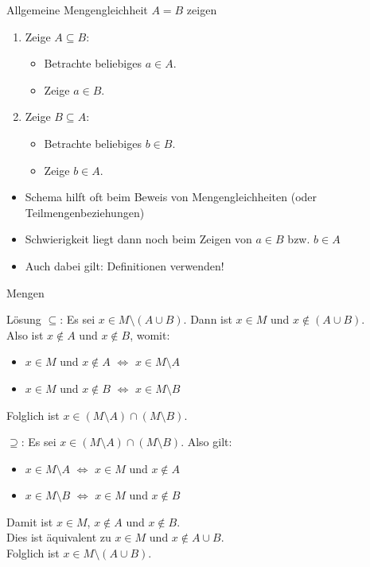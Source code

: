 	\begin{frame}{Allgemeine Mengengleichheit $A=B$ zeigen}

		\begin{enumerate}
			\item Zeige $A \subseteq B$: \begin{itemize}
				\item Betrachte beliebiges $a \in A$.
				\item Zeige $a \in B$.
			\end{itemize}
			\item Zeige $B \subseteq A$: \begin{itemize}
				\item Betrachte beliebiges $b \in B$.
				\item Zeige $b \in A$.
			\end{itemize}
		\end{enumerate}
		\pause
		\medskip
		\begin{itemize}
			\item Schema hilft oft beim Beweis von Mengengleichheiten (oder Teilmengenbeziehungen)
			\item Schwierigkeit liegt dann noch beim Zeigen von $a \in B$ bzw. $b \in A$
			\item Auch dabei gilt: Definitionen verwenden!
		\end{itemize}
		
	\end{frame}

	\begin{frame}{Mengen}
		\begin{block}{Lösung}
			$\subseteq$:
				Es sei $x \in M \setminus (A \cup B)$. Dann ist $x \in M$ und $x \notin (A \cup B)$.\\
				Also ist $x \notin A$ und $x \notin B$, womit:
				\begin{itemize}
					\itemsep0pt
					\item $x \in M$ und $x \notin A$ $\Longleftrightarrow $ $x \in M \setminus A$
					\item $x \in M$ und $x \notin B$ $\Longleftrightarrow$ $x \in M \setminus B$
				\end{itemize}
				Folglich ist $x \in (M \setminus A)  \cap (M \setminus B)$.\\[1em]

			\pause

			$\supseteq$:
				Es sei $x \in (M \setminus A) \cap (M \setminus B)$. Also gilt:
				\begin{itemize}
					\itemsep0pt
					\item $x \in M \setminus A$ $\Longleftrightarrow$ $x \in M$ und $x \notin A$
					\item $x \in M \setminus B$ $\Longleftrightarrow$ $x \in M$ und $x \notin B$
				\end{itemize}
				Damit ist $x \in M$, $x \notin A$ und $x \notin B$. \\
				Dies ist äquivalent zu $x \in M$ und $x \notin A \cup B$.\\
				Folglich ist $x \in M \setminus (A \cup B)$.

		\end{block}
	\end{frame}